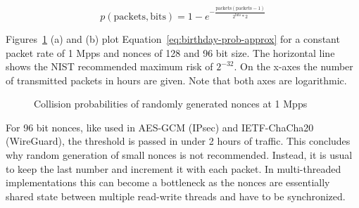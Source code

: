 \begin{equation}
p(\textrm{packets}, \textrm{bits}) = 1 - e^{- \frac{\textrm{packets}(\textrm{packets}-1)}
	{2^\textrm{bits}*2}}
\label{eq:birthday-prob-approx}
\end{equation}

Figures~\ref{fig:collisionprob1mpps} (a) and (b) plot Equation~\ref{eq:birthday-prob-approx} for a constant packet rate of 1 Mpps and nonces of 128 and 96 bit size. The horizontal line shows the NIST recommended maximum risk of $2^{-32}$. On the x-axes the number of transmitted packets in hours are given. Note that both axes are logarithmic. 

\begin{figure}[h]
	\centering
	\caption{Collision probabilities of randomly generated nonces at 1 Mpps}
	\label{fig:collisionprob1mpps}
\end{figure}


For 96 bit nonces, like used in AES-GCM (IPsec) and IETF-ChaCha20 (WireGuard), the threshold is passed in under 2 hours of traffic.
This concludes why random generation of small nonces is not recommended. Instead, it is usual to keep the last number and increment it with each packet. In multi-threaded implementations this can become a bottleneck as the nonces are essentially shared state between multiple read-write threads and have to be synchronized.

